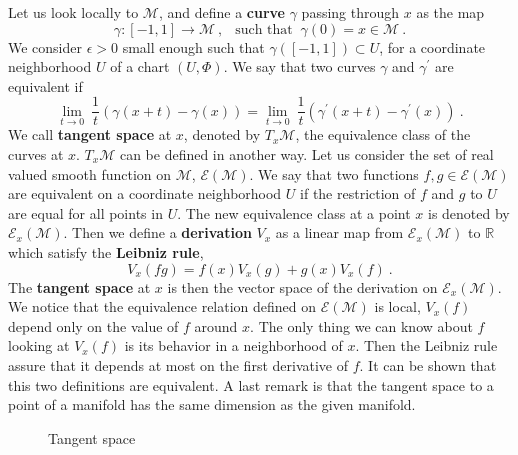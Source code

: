 \documentclass[12pt]{book}
\newcommand{\Ecal}{\mathcal{E}}
\newcommand{\Mcal}{\mathcal{M}}
\newcommand{\Rbb}{\mathbb{R}}
\theoremstyle{break}
\begin{document}
Let us look locally to $\Mcal$, and define a \textbf{curve} $\gamma$ passing through $x$ as the map  
%
\begin{equation*}
\gamma : [-1,1] \to \Mcal \ , \ \ \mbox{ such that } \ \gamma(0) = x \in \Mcal \ .
\end{equation*}
%
We consider $\epsilon > 0$ small enough such that $\gamma([-1,1]) \subset U$, for a coordinate neighborhood $U$ of a chart $(U,\Phi)$. We say that two curves $\gamma$ and $\gamma^\prime$ are equivalent if
%
\begin{equation*}
\underset{t \to 0}{\lim} \ \frac{1}{t} \left( \gamma(x+t) - \gamma(x) \right) = \underset{t \to 0}{\lim} \ \frac{1}{t} \left( \gamma^\prime(x+t) - \gamma^\prime(x) \right) \ .
\end{equation*}
%
We call \textbf{tangent space} at $x$, denoted by $T_x\Mcal$, the equivalence class of the curves at $x$. $T_x\Mcal$ can be defined in another way. Let us consider the set of real valued smooth function on $\Mcal$, $\Ecal(\Mcal)$. We say that two functions $f, g \in \Ecal(\Mcal)$ are equivalent on a coordinate neighborhood $U$ if the restriction of $f$ and $g$ to $U$ are equal for all points in $U$. The new equivalence class at a point $x$ is denoted by $\Ecal_x(\Mcal)$. Then we define a \textbf{derivation} $V_x$ as a linear map from $\Ecal_x(\Mcal)$ to $\Rbb$ which satisfy the \textbf{Leibniz rule},
%
\begin{equation*}
V_x(fg) = f(x) V_x(g) + g(x) V_x(f) \ .
\end{equation*}
%
The \textbf{tangent space} at $x$ is then the vector space of the derivation on $\Ecal_x(\Mcal)$. We notice that the equivalence relation defined on $\Ecal(\Mcal)$ is local, $V_x(f)$ depend only on the value of $f$ around $x$. The only thing we can know about $f$ looking at $V_x(f)$ is its behavior in a neighborhood of $x$. Then the Leibniz rule assure that it depends at most on the first derivative of $f$. It can be shown that this two definitions are equivalent. A last remark is that the tangent space to a point of a manifold has the same dimension as the given manifold.


\begin{figure}[ht!]
\begin{center}
\end{center}
\caption{Tangent space}
\end{figure}
\end{document}
